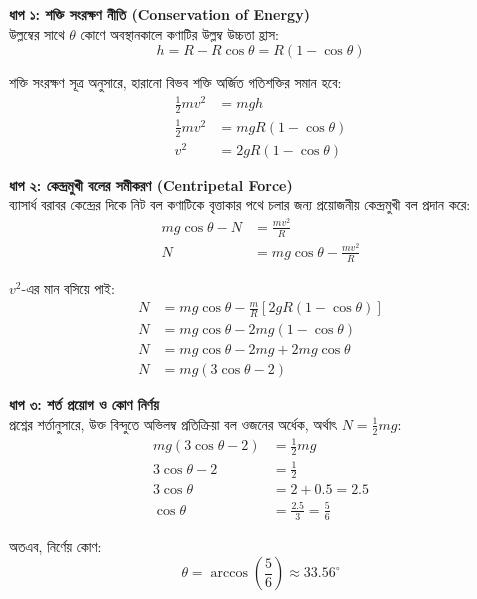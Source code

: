 \documentclass[12pt, a4paper]{article}
\begin{document}
\begin{tcolorbox}[solutionbox={সমাধান (Solution)}]
    \noindent
    \textbf{ধাপ ১: শক্তি সংরক্ষণ নীতি (Conservation of Energy)} \\
    উল্লম্বের সাথে $\theta$ কোণে অবস্থানকালে কণাটির উল্লম্ব উচ্চতা হ্রাস:
    \[ h = R - R \cos\theta = R (1 - \cos\theta) \]
    
    শক্তি সংরক্ষণ সূত্র অনুসারে, হারানো বিভব শক্তি অর্জিত গতিশক্তির সমান হবে:
    \begin{align*}
        \frac{1}{2} m v^2 &= m g h \\
        \frac{1}{2} m v^2 &= m g R (1 - \cos\theta) \\
        v^2 &= 2 g R (1 - \cos\theta)
    \end{align*}
    
    \vspace{0.5em}
    \noindent\textbf{ধাপ ২: কেন্দ্রমুখী বলের সমীকরণ (Centripetal Force)} \\
    ব্যাসার্ধ বরাবর কেন্দ্রের দিকে নিট বল কণাটিকে বৃত্তাকার পথে চলার জন্য প্রয়োজনীয় কেন্দ্রমুখী বল প্রদান করে:
    \begin{align*}
        m g \cos\theta - N &= \frac{m v^2}{R} \\
        N &= m g \cos\theta - \frac{m v^2}{R}
    \end{align*}
    
    $v^2$-এর মান বসিয়ে পাই:
    \begin{align*}
        N &= m g \cos\theta - \frac{m}{R} \left[ 2 g R (1 - \cos\theta) \right] \\
        N &= m g \cos\theta - 2 m g (1 - \cos\theta) \\
        N &= m g \cos\theta - 2 m g + 2 m g \cos\theta \\
        N &= m g (3\cos\theta - 2)
    \end{align*}
    
    \vspace{0.5em}
    \noindent\textbf{ধাপ ৩: শর্ত প্রয়োগ ও কোণ নির্ণয়} \\
    প্রশ্নের শর্তানুসারে, উক্ত বিন্দুতে অভিলম্ব প্রতিক্রিয়া বল ওজনের অর্ধেক, অর্থাৎ $N = \frac{1}{2} m g$:
    \begin{align*}
        m g (3\cos\theta - 2) &= \frac{1}{2} m g \\
        3\cos\theta - 2 &= \frac{1}{2} \\
        3\cos\theta &= 2 + 0.5 = 2.5 \\
        \cos\theta &= \frac{2.5}{3} = \frac{5}{6}
    \end{align*}
    
    অতএব, নির্ণেয় কোণ:
    \[ \theta = \arccos\left(\frac{5}{6}\right) \approx \mathbf{33.56^\circ} \]
\end{tcolorbox}
\end{document}

